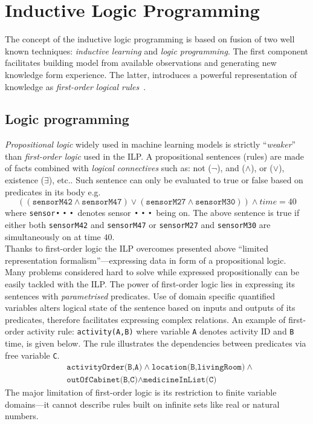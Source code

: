 \documentclass[10pt, a4paper, pdflatex, leqno, twoside, openright]{report}
\DeclareMathOperator*{\Bigcdot}{\scalerel*{\cdot}{\bigodot}}
\begin{document}
  \section{Inductive Logic Programming}
The concept of the inductive logic programming is based on fusion of two well known techniques: \emph{inductive learning} and \emph{logic programming}. The first component facilitates building model from available observations and generating new knowledge form experience. The latter, introduces a powerful representation of knowledge as \emph{first-order logical rules}~\citep{muggleton1994inductive,muggleton1995inverse}.

    \subsection{Logic programming}
\emph{Propositional logic} widely used in machine learning models is strictly ``\emph{weaker}'' than \emph{first-order logic} used in the ILP. A propositional sentences (rules) are made of facts combined with \emph{logical connectives} such as: not ($\neg$), and ($\land$), or ($\lor$), existence ($\exists$), etc.. Such sentence can only be evaluated to true or false based on predicates in its body e.g.\
$$\left(\left(\texttt{sensorM42} \land \texttt{sensorM47}\right) \lor \left(\texttt{sensorM27} \land \texttt{sensorM30}\right)\right) \land time = 40$$
where \texttt{sensor$\Bigcdot\Bigcdot\Bigcdot$} denotes sensor $\Bigcdot\Bigcdot\Bigcdot$ being on. The above sentence is true if either both \texttt{sensorM42} and \texttt{sensorM47} or \texttt{sensorM27} and \texttt{sensorM30} are simultaneously on at time $40$.\\

Thanks to first-order logic the ILP overcomes presented above ``limited representation formalism''---expressing data in form of a propositional logic. Many problems considered hard to solve while expressed propositionally can be easily tackled with the ILP. The power of first-order logic lies in expressing its sentences with \emph{parametrised} predicates. Use of domain specific quantified variables alters logical state of the sentence based on inputs and outputs of its predicates, therefore facilitates expressing complex relations. An example of first-order activity rule: \texttt{activity(A,B)} where variable \texttt{A} denotes activity ID and \texttt{B} time, is given below. The rule illustrates the dependencies between predicates via free variable \texttt{C}.
\begin{eqnarray*}
&\texttt{activityOrder(B,A)} \land \texttt{location(B,livingRoom)} \land \\
&\texttt{outOfCabinet(B,C)} \land \texttt{medicineInList(C)}
\end{eqnarray*}
The major limitation of first-order logic is its restriction to finite variable domains---it cannot describe rules built on infinite sets like real or natural numbers.\\
\end{document}
